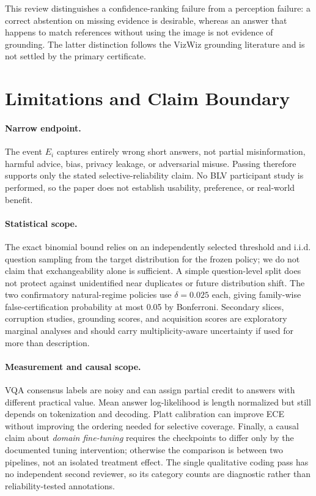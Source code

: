 \documentclass[11pt]{article}
\newcommand{\FamilyFailureProb}{0.05}
\newcommand{\PrimaryFailureProb}{0.025}
\begin{document}
This review distinguishes a confidence-ranking failure from a perception failure:
a correct abstention on missing evidence is desirable, whereas an answer
that happens to match references without using the image is not evidence of
grounding.  The latter distinction follows the VizWiz grounding literature
\citep{Chen_2022_CVPR} and is not settled by the primary certificate.

\section{Limitations and Claim Boundary}

\paragraph{Narrow endpoint.}
The event $E_i$ captures entirely wrong short answers, not partial misinformation,
harmful advice, bias, privacy leakage, or adversarial misuse.  Passing therefore
supports only the stated selective-reliability claim.  No BLV participant study is
performed, so the paper does not establish usability, preference, or real-world
benefit.

\paragraph{Statistical scope.}
The exact binomial bound relies on an independently selected threshold and i.i.d.
question sampling from the target distribution for the frozen policy; we do not
claim that exchangeability alone is sufficient.  A simple question-level split does not
protect against unidentified near duplicates or future distribution shift.  The
two confirmatory natural-regime policies use
$\delta=\PrimaryFailureProb$ each, giving family-wise false-certification
probability at most \FamilyFailureProb{} by Bonferroni.  Secondary slices,
corruption studies, grounding scores, and acquisition scores are exploratory
marginal analyses and should carry multiplicity-aware uncertainty if used for more
than description.

\paragraph{Measurement and causal scope.}
VQA consensus labels are noisy and can assign partial credit to answers with
different practical value.  Mean answer log-likelihood is length normalized but
still depends on tokenization and decoding.  Platt calibration can improve ECE
without improving the ordering needed for selective coverage.  Finally, a causal
claim about \emph{domain fine-tuning} requires the checkpoints to differ only by the
documented tuning intervention; otherwise the comparison is between two pipelines,
not an isolated treatment effect.  The single qualitative coding pass
has no independent second reviewer, so its category counts are diagnostic rather than
reliability-tested annotations.
\end{document}
